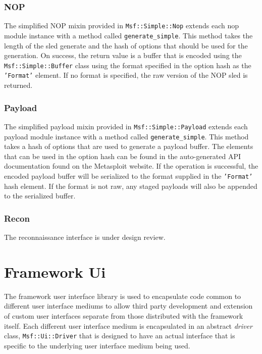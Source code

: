 \documentclass{report}
\begin{document}
        \subsection{NOP}

\par
The simplified NOP mixin provided in \texttt{Msf::Simple::Nop}
extends each nop module instance with a method called
\texttt{generate\_simple}.  This method takes the length of the sled
generate and the hash of options that should be used for the
generation.  On success, the return value is a buffer that is
encoded using the \texttt{Msf::Simple::Buffer} class using the
format specified in the option hash as the \texttt{'Format'}
element.  If no format is specified, the raw version of the NOP sled
is returned.

        \subsection{Payload}

\par
The simplified payload mixin provided in
\texttt{Msf::Simple::Payload} extends each payload module instance
with a method called \texttt{generate\_simple}.  This method takes a
hash of options that are used to generate a payload buffer.  The
elements that can be used in the option hash can be found in the
auto-generated API documentation found on the Metasploit website. If
the operation is successful, the encoded payload buffer will be
serialized to the format supplied in the \texttt{'Format'} hash
element.  If the format is not raw, any staged payloads will also be
appended to the serialized buffer.

        \subsection{Recon}

\par
The reconnaissance interface is under design review.

\chapter{Framework Ui}

\par
The framework user interface library is used to encapsulate code
common to different user interface mediums to allow third party
development and extension of custom user interfaces separate from
those distributed with the framework itself.  Each different user
interface medium is encapsulated in an abstract \textit{driver}
class, \texttt{Msf::Ui::Driver} that is designed to have an actual
interface that is specific to the underlying user interface medium
being used.
\end{document}
